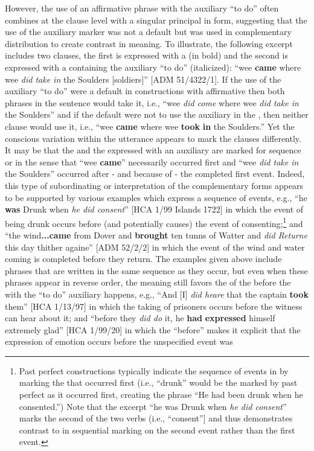 However, the use of an affirmative  phrase with the auxiliary “to do” often combines at the clause level with a singular principal  in  form, suggesting that the use of the auxiliary marker was not a default but was used in complementary distribution to create contrast in meaning. To illustrate, the following excerpt includes two clauses, the first is expressed with a   (in bold) and the second is expressed with a  containing the auxiliary “to do” (italicized): “wee \textbf{came} where wee \textit{did take in} the Soulders [soldiers]” [ADM 51/4322/1]. If the use of the auxiliary “to do” were a default in constructions with affirmative  then both  phrases in the sentence would take it, i.e., “wee \textit{did come} where wee \textit{did take in} the Soulders” and if the default were not to use the auxiliary in the , then neither clause would use it, i.e., “wee \textbf{came} where wee \textbf{took} \textbf{in} the Soulders.” Yet the conscious variation within the utterance appears to mark the clauses differently. It may be that the  and the  expressed with an auxiliary are marked for sequence or  in the sense that “wee \textbf{came}” necessarily occurred first and “wee \textit{did take in} the Soulders” occurred after - and because of - the completed first event. Indeed, this type of subordinating or  interpretation of the complementary  forms appears to be supported by various examples which express a sequence of events, e.g., “he \textbf{was} Drunk when \textit{he did consent}” [HCA 1/99  Islands 1722] in which the event of being drunk occurs before (and potentially causes) the event of consenting;\footnote{Past perfect constructions typically indicate the sequence of events in  by marking the  that occurred first (i.e., “drunk” would be the  marked by past perfect as it occurred first, creating the phrase “He had been drunk when he consented.”) Note that the excerpt “he was Drunk when \textit{he did consent}” marks the second of the two verbs (i.e., “consent”] and thus demonstrates contrast to  in sequential marking on the second event rather than the first event.}  and “the wind\textbf{...came} from Dover and \textbf{brought} ten tunns of Watter and \textit{did Returne} this day thither againe” [ADM 52/2/2] in which the event of the wind and water coming is completed before they return. The examples given above include  phrases that are written in the same sequence as they occur, but even when these  phrases appear in reverse order, the meaning still favors the  of the   before the  with the “to do” auxiliary happens, e.g., “And [I] \textit{did heare} that the captain \textbf{took} them” [HCA 1/13/97] in which the taking of prisoners occurs before the witness can hear about it; and “before they \textit{did do} it, he \textbf{had} \textbf{expressed} himself extremely glad” [HCA 1/99/20] in which the  “before” makes it explicit that the expression of emotion occurs before the unspecified event was 